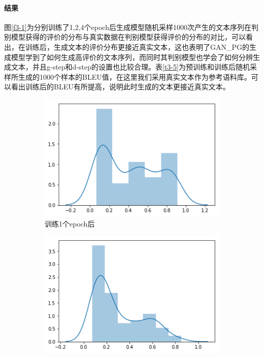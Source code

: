 \paragraph{结果}
图\ref{f3-1}为分别训练了1,2,4个epoch后生成模型随机采样1000次产生的文本序列在判别模型获得的评价的分布与真实数据在判别模型获得评价的分布的对比，可以看出，在训练后，生成文本的评价分布更接近真实文本，这也表明了GAN\_PG的生成模型学到了如何生成高评价的文本序列，而同时其判别模型也学会了如何分辨生成文本，并且g-step和d-step的设置也比较合理。表\ref{t3-5}为预训练和训练后随机采样所生成的1000个样本的BLEU值，在这里我们采用真实文本作为参考语料库。可以看出训练后的BLEU有所提高，说明此时生成的文本更接近真实文本。
\begin{figure}[htb]
    \centering
	\begin{subfigure}{.4\textwidth}
		\includegraphics[width=\textwidth]{0.png}
		\caption{训练1个epoch后}
	\end{subfigure}
	\begin{subfigure}{.4\textwidth}
		\includegraphics[width=\textwidth]{1.png}

\end{subfigure}
\end{figure}

